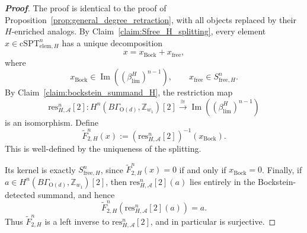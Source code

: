 \documentclass[aps,prx,reprint,superscriptaddress,twocolumn,amsmath,amssymb,amsfonts, nofootinbib]{revtex4-2}
\newcommand{\res}{\text{res}}
\theoremstyle{apsstyle}
\begin{document}
\begin{proof}[\textnormal{\textbf{Proof}}]
The proof is identical to the proof of Proposition~\ref{prop:general_degree_retraction}, with all objects replaced by their $H$-enriched analogs. By Claim~\ref{claim:Sfree_H_splitting}, every element $x\in \mathrm{cSPT}_{\mathrm{elem},H}^{n}$ has a unique decomposition
\begin{equation}
x=x_{\mathrm{Bock}}+x_{\mathrm{free}},
\end{equation}
where
\begin{equation}
x_{\mathrm{Bock}}\in \operatorname{Im}\left(\left(\beta_{\lim}^{H}\right)^{n-1}\right),
\qquad
x_{\mathrm{free}}\in S_{\mathrm{free},H}^{n}.
\end{equation}
By Claim~\ref{claim:bockstein_summand_H}, the restriction map
\begin{equation}
\res_{H,\mathcal A}^{n}[2]:
H^{n}(B\Gamma_{\mathrm{O}(d)},\mathbb Z_{w_1})[2]
\xrightarrow{\cong}
\operatorname{Im}\left(\left(\beta_{\lim}^{H}\right)^{n-1}\right)
\end{equation}
is an isomorphism. Define
\begin{equation}
\widetilde F_{2,H}^{n}(x)
:=
\left(\res_{H,\mathcal A}^{n}[2]\right)^{-1}(x_{\mathrm{Bock}}).
\end{equation}
This is well-defined by the uniqueness of the splitting.

Its kernel is exactly $S_{\mathrm{free},H}^{n}$, since $\widetilde F_{2,H}^{n}(x)=0$ if and only if $x_{\mathrm{Bock}}=0$. Finally, if $a\in H^{n}(B\Gamma_{\mathrm{O}(d)},\mathbb Z_{w_1})[2]$, then $\res_{H,\mathcal A}^{n}[2](a)$ lies entirely in the Bockstein-detected summand, and hence
\begin{equation}
\widetilde F_{2,H}^{n}\left(\res_{H,\mathcal A}^{n}[2](a)\right)=a.
\end{equation}
Thus $\widetilde F_{2,H}^{n}$ is a left inverse to $\res_{H,\mathcal A}^{n}[2]$, and in particular is surjective.
\end{proof}

\bigskip 
\end{document}
